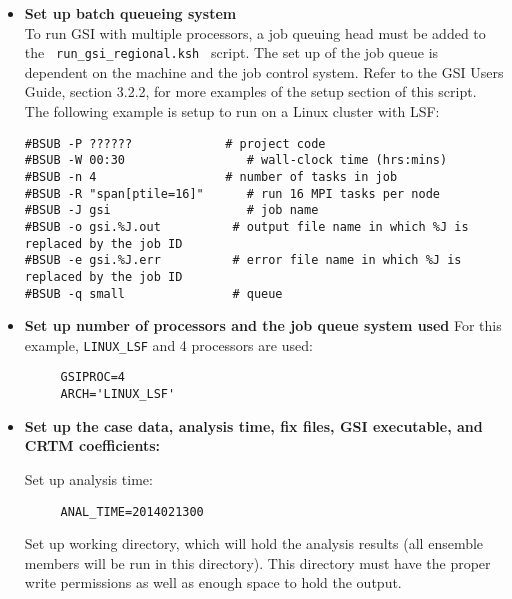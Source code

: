 \begin{itemize}
\item \textbf{Set up batch queueing system} \\
To run GSI with multiple processors, a job queuing head must be added to the \verb| run_gsi_regional.ksh | script. The set up of the job queue is dependent on the machine and the job control system. Refer to the GSI User\textquotesingle s
 Guide, section 3.2.2, for more examples of the setup section of this script. The following example is setup to run on a Linux cluster with LSF:
\begin{footnotesize}
\begin{verbatim}
#BSUB -P ??????             # project code
#BSUB -W 00:30                 # wall-clock time (hrs:mins)
#BSUB -n 4                  # number of tasks in job         
#BSUB -R "span[ptile=16]"      # run 16 MPI tasks per node
#BSUB -J gsi                   # job name
#BSUB -o gsi.%J.out          # output file name in which %J is replaced by the job ID
#BSUB -e gsi.%J.err          # error file name in which %J is replaced by the job ID
#BSUB -q small               # queue
\end{verbatim}
\end{footnotesize}

\item \textbf{Set up number of processors and the job queue system used} 
For this example, \verb|LINUX_LSF| and 4 processors are used:

\begin{footnotesize}
\begin{verbatim}
     GSIPROC=4 
     ARCH='LINUX_LSF'
\end{verbatim}
\end{footnotesize}

\item \textbf{Set up the case data, analysis time, fix files, GSI executable, and CRTM coefficients:} 

Set up analysis time:

\begin{footnotesize}
\begin{verbatim}
     ANAL_TIME=2014021300
\end{verbatim}
\end{footnotesize}

Set up working directory, which will hold the analysis results (all ensemble members will be run in this directory). This directory must have the proper write permissions as well as enough space to hold the output.


\end{itemize}
